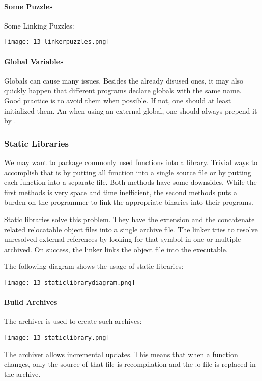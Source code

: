 \paragraph{Some Puzzles}
Some Linking Puzzles:

\texttt{[image: 13\_linkerpuzzles.png]}

\paragraph{Global Variables}
Globals can cause many issues. Besides the already disused ones, it may also quickly happen that different programs declare globals with the same name. Good practice is to avoid them when possible. If not, one should at least initialized them. An when using an external global, one should always prepend it by .

\subsubsection{Static Libraries}
We may want to package commonly used functions into a library. Trivial ways to accomplish that is by putting all function into a single source file or by putting each function into a separate file. Both methods have some downsides. While the first methods is very space and time inefficient, the second methods puts a burden on the programmer to link the appropriate binaries into their programs.

Static libraries solve this problem. They have the extension  and the concatenate related relocatable object files into a single archive file. The linker tries to resolve unresolved external references by looking for that symbol in one or multiple archived. On success, the linker links the object file into the executable.

The following diagram shows the usage of static libraries:

\texttt{[image: 13\_staticlibrarydiagram.png]}

\paragraph{Build Archives}
The archiver  is used to create such archives:

\texttt{[image: 13\_staticlibrary.png]}

The archiver allows incremental updates. This means that when a function changes, only the source of that file is recompilation and the .o file is replaced in the archive.


